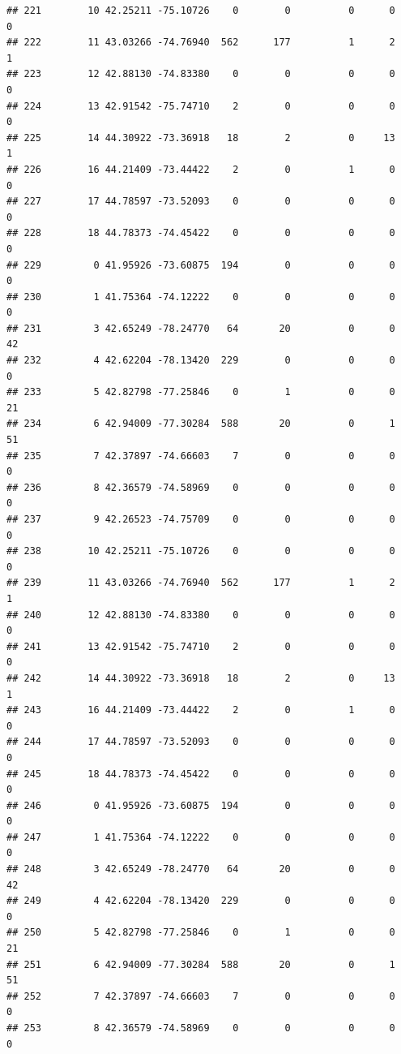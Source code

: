 \documentclass[
]{article}
\begin{document}
\begin{verbatim}
## 221        10 42.25211 -75.10726    0        0          0      0            0
## 222        11 43.03266 -74.76940  562      177          1      2            1
## 223        12 42.88130 -74.83380    0        0          0      0            0
## 224        13 42.91542 -75.74710    2        0          0      0            0
## 225        14 44.30922 -73.36918   18        2          0     13            1
## 226        16 44.21409 -73.44422    2        0          1      0            0
## 227        17 44.78597 -73.52093    0        0          0      0            0
## 228        18 44.78373 -74.45422    0        0          0      0            0
## 229         0 41.95926 -73.60875  194        0          0      0            0
## 230         1 41.75364 -74.12222    0        0          0      0            0
## 231         3 42.65249 -78.24770   64       20          0      0           42
## 232         4 42.62204 -78.13420  229        0          0      0            0
## 233         5 42.82798 -77.25846    0        1          0      0           21
## 234         6 42.94009 -77.30284  588       20          0      1           51
## 235         7 42.37897 -74.66603    7        0          0      0            0
## 236         8 42.36579 -74.58969    0        0          0      0            0
## 237         9 42.26523 -74.75709    0        0          0      0            0
## 238        10 42.25211 -75.10726    0        0          0      0            0
## 239        11 43.03266 -74.76940  562      177          1      2            1
## 240        12 42.88130 -74.83380    0        0          0      0            0
## 241        13 42.91542 -75.74710    2        0          0      0            0
## 242        14 44.30922 -73.36918   18        2          0     13            1
## 243        16 44.21409 -73.44422    2        0          1      0            0
## 244        17 44.78597 -73.52093    0        0          0      0            0
## 245        18 44.78373 -74.45422    0        0          0      0            0
## 246         0 41.95926 -73.60875  194        0          0      0            0
## 247         1 41.75364 -74.12222    0        0          0      0            0
## 248         3 42.65249 -78.24770   64       20          0      0           42
## 249         4 42.62204 -78.13420  229        0          0      0            0
## 250         5 42.82798 -77.25846    0        1          0      0           21
## 251         6 42.94009 -77.30284  588       20          0      1           51
## 252         7 42.37897 -74.66603    7        0          0      0            0
## 253         8 42.36579 -74.58969    0        0          0      0            0

\end{verbatim}
\end{document}
